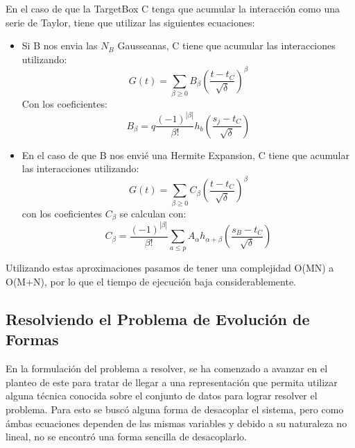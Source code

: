 \documentclass[letter, 10pt]{article}
\begin{document}
En el caso de que la TargetBox C tenga que acumular la interacción como una serie de Taylor, tiene que utilizar las siguientes ecuaciones:
\begin{itemize}
\item Si B nos envia las $N_B$ Gausseanas, C tiene que acumular las interacciones utilizando:
\begin{equation}
 G(t) = \sum_{\beta \geq 0} B_\beta \left( \frac{t-t_C}{\sqrt{\delta}} \right) ^\beta
\end{equation}
Con los coeficientes:
\begin{equation}
B_\beta = q \frac{(-1)^|\beta|}{\beta!}h_b\left(\frac{s_j - t_C}{\sqrt{\delta}}\right)
\end{equation}

\item En el caso de que B nos envié una Hermite Expansion, C tiene que acumular las interacciones utilizando:
\begin{equation}
G(t) = \sum_{\beta \geq 0} C_\beta \left(\frac{t-t_C}{\sqrt{\delta}}\right)^\beta
\end{equation}
con los coeficientes $C_\beta$ se calculan con:
\begin{equation}
C_\beta = \frac{(-1)^{|\beta|}}{\beta!} \sum_{a\leq p} A_\alpha h_{\alpha + \beta} \left( \frac{s_B - t_C}{\sqrt{\delta}} \right)
\end{equation}
\end{itemize}


Utilizando estas aproximaciones pasamos de tener una complejidad O(MN) a O(M+N), por lo que el tiempo de ejecución baja considerablemente.


\subsection{Resolviendo el Problema de Evolución de Formas}
En la formulación del problema a resolver, se ha comenzado a avanzar en el planteo de este para tratar de llegar a una representación que permita utilizar alguna técnica conocida sobre el conjunto de datos para lograr resolver el problema. Para esto se buscó alguna forma de desacoplar el sistema, pero como ámbas ecuaciones dependen de las mismas variables y debido a su naturaleza no lineal, no se encontró una forma sencilla de desacoplarlo.
\end{document}
